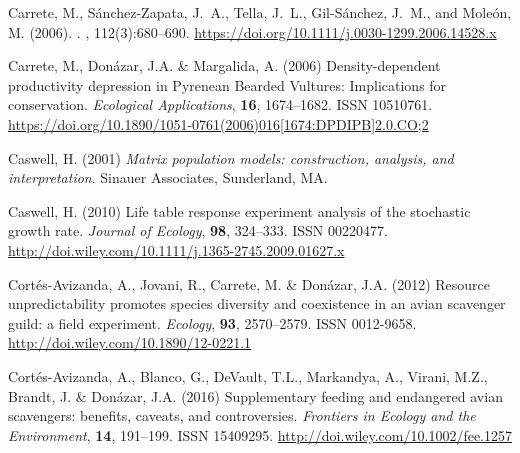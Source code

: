 \documentclass[12pt]{article}
\begin{document}
\begin{thebibliography}{87}
	Carrete, M., S{\'{a}}nchez-Zapata, J.~A., Tella, J.~L., Gil-S{\'{a}}nchez,
	J.~M., and Mole{\'{o}}n, M. (2006).
	.
	, 112(3):680--690.
	\newline\urlprefix\url{https://doi.org/10.1111/j.0030-1299.2006.14528.x}
	
	Carrete, M., Don{\'{a}}zar, J.A. \& Margalida, A. (2006) {Density-dependent
		productivity depression in Pyrenean Bearded Vultures: Implications for
		conservation}.
	\newblock \emph{Ecological Applications}, \textbf{16}, 1674--1682.
	\newblock ISSN 10510761.
	\newline\urlprefix\url{https://doi.org/10.1890/1051-0761(2006)016[1674:DPDIPB]2.0.CO;2}
	
	Caswell, H. (2001) \emph{{Matrix population models: construction, analysis, and
			interpretation}}.
	\newblock Sinauer Associates, Sunderland, MA.
	
	Caswell, H. (2010) {Life table response experiment analysis of the stochastic
		growth rate}.
	\newblock \emph{Journal of Ecology}, \textbf{98}, 324--333.
	\newblock ISSN 00220477.
	\newline\urlprefix\url{http://doi.wiley.com/10.1111/j.1365-2745.2009.01627.x}
	
	Cort{\'{e}}s-Avizanda, A., Jovani, R., Carrete, M. \& Don{\'{a}}zar, J.A.
	(2012) {Resource unpredictability promotes species diversity and coexistence
		in an avian scavenger guild: a field experiment}.
	\newblock \emph{Ecology}, \textbf{93}, 2570--2579.
	\newblock ISSN 0012-9658.
	\newline\urlprefix\url{http://doi.wiley.com/10.1890/12-0221.1}
	
	Cort{\'{e}}s-Avizanda, A., Blanco, G., DeVault, T.L., Markandya, A., Virani,
	M.Z., Brandt, J. \& Don{\'{a}}zar, J.A. (2016) {Supplementary feeding and
		endangered avian scavengers: benefits, caveats, and controversies}.
	\newblock \emph{Frontiers in Ecology and the Environment}, \textbf{14},
	191--199.
	\newblock ISSN 15409295.
	\newline\urlprefix\url{http://doi.wiley.com/10.1002/fee.1257}
	

\end{thebibliography}
\end{document}
